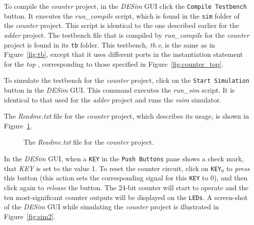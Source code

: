 {To compile the {\it counter} project, in the {\it DESim} GUI click the \texttt{Compile Testbench}
button. It executes the {\it run\_compile} script, which
is found in the \texttt{sim} folder of the {\it counter} project. This script 
is identical to the one described earlier for the {\it adder} project. 
The testbench file that is compiled by {\it run\_compile} for the {\it counter} project is  
found in its \texttt{tb} folder. This testbench, {\it tb.v}, is the same as in
Figure~\ref{fig:tb}, except that it uses different ports in the instantiation statement
for the {\it top} \hdlModuleName, corresponding to those specified in 
Figure~\ref{fig:counter_top}.

To simulate the testbench for the {\it counter} project, click on the
\texttt{Start Simulation} button in the {\it DESim} GUI. This command executes the
{\it run\_sim} script. It is identical to that used for the 
{\it adder} project and runs the {\it vsim} simulator.

The {\it Readme.txt} file for the {\it counter} project, which describes its usage,
is shown in Figure~\ref{fig:readme_counter}. 

\begin{figure}[H]
\begin{center}
\begin{minipage}[t]{15 cm}
	\ifverilog
        \ifnotSV
            
        \else
            
        \fi
    \else
        
    \fi
\end{minipage}
    \caption{The {\it Readme.txt} file for the {\it counter} project.}
	\label{fig:readme_counter}
\end{center}
\end{figure}

\vspace{-0.5cm}
In the {\it DESim} GUI, when a \texttt{KEY} in the \texttt{Push Buttons} pane shows a check mark,
that {\it KEY} is set to the value 1. To reset the counter circuit, 
click on \texttt{KEY}$_0$ to {\it press} this button (this action sets the corresponding 
signal for this \texttt{KEY} to 0), and then click again to {\it release} the button. 
The 24-bit counter will start to operate and the ten
most-significant counter outputs will be displayed on the \texttt{LEDs}. A screen-shot of
the {\it DESim} GUI while simulating the {\it counter} project is illustrated in 
Figure~\ref{fig:sim2}.

}
